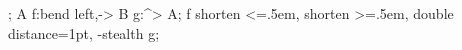 
;
\mor A f:{bend left},-> B g:^> A;
\mor f {shorten <=.5em, shorten >=.5em, double distance=1pt, -stealth} g;
